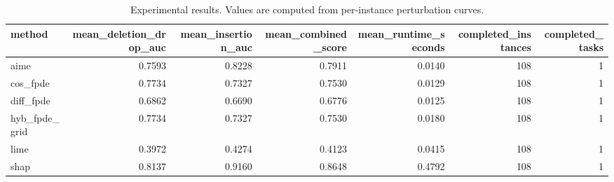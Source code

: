 \begin{table}[t]
\caption{Experimental results. Values are computed from per-instance perturbation curves.}
\label{tab:main_results_computed}
\centering
\begin{tabular}{lrrrrrr}
\toprule
method & mean\_deletion\_drop\_auc & mean\_insertion\_auc & mean\_combined\_score & mean\_runtime\_seconds & completed\_instances & completed\_tasks \\
\midrule
aime & 0.7593 & 0.8228 & 0.7911 & 0.0140 & 108 & 1 \\
cos\_fpde & 0.7734 & 0.7327 & 0.7530 & 0.0129 & 108 & 1 \\
diff\_fpde & 0.6862 & 0.6690 & 0.6776 & 0.0125 & 108 & 1 \\
hyb\_fpde\_grid & 0.7734 & 0.7327 & 0.7530 & 0.0180 & 108 & 1 \\
lime & 0.3972 & 0.4274 & 0.4123 & 0.0415 & 108 & 1 \\
shap & 0.8137 & 0.9160 & 0.8648 & 0.4792 & 108 & 1 \\
\bottomrule
\end{tabular}

\end{table}
